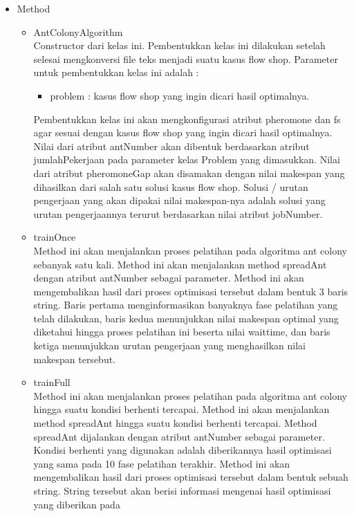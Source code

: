 \begin{itemize}
\begin{itemize}
\begin{itemize}
			\end{itemize}
			\item Method
			\begin{itemize}
				\item AntColonyAlgorithm \\
				Constructor dari kelas ini. Pembentukkan kelas ini dilakukan setelah selesai mengkonversi 
				file teks menjadi suatu kasus flow shop. Parameter untuk pembentukkan
				kelas ini adalah :
				\begin{itemize}
					\item problem : kasus flow shop yang ingin dicari hasil optimalnya.
				\end{itemize}
				Pembentukkan kelas ini akan mengkonfigurasi atribut pheromone dan fs agar sesuai
				dengan kasus flow shop yang ingin dicari hasil optimalnya. Nilai dari atribut
				antNumber akan dibentuk berdasarkan atribut jumlahPekerjaan pada parameter
				kelas Problem yang dimasukkan. Nilai dari atribut pheromoneGap akan disamakan
				dengan nilai makespan yang dihasilkan dari salah satu solusi kasus flow shop.
				Solusi / urutan pengerjaan yang akan dipakai nilai makespan-nya adalah solusi yang
				urutan pengerjaannya terurut berdasarkan nilai atribut jobNumber.
				\item trainOnce \\
				Method ini akan menjalankan proses pelatihan pada algoritma ant colony sebanyak
				satu kali. Method ini akan menjalankan method spreadAnt dengan atribut antNumber
				sebagai parameter. Method ini akan mengembalikan hasil dari proses optimisasi
				tersebut dalam bentuk 3 baris string. Baris pertama menginformasikan banyaknya
				fase pelatihan yang telah dilakukan, baris kedua menunjukkan nilai makespan
				optimal yang diketahui hingga proses pelatihan ini beserta nilai waittime, dan baris 
				ketiga menunjukkan urutan pengerjaan yang menghasilkan nilai makespan tersebut.
				\item trainFull \\
				Method ini akan menjalankan proses pelatihan pada algoritma ant colony hingga
				suatu kondisi berhenti tercapai. Method ini akan menjalankan method spreadAnt
				hingga suatu kondisi berhenti tercapai. Method spreadAnt dijalankan dengan atribut
				antNumber sebagai parameter. Kondisi berhenti yang digunakan adalah diberikannya
				hasil optimisasi yang sama pada 10 fase pelatihan terakhir. Method ini akan
				mengembalikan hasil dari proses optimisasi tersebut dalam bentuk sebuah string.
				String tersebut akan berisi informasi mengenai hasil optimisasi yang diberikan pada

\end{itemize}
\end{itemize}
\end{itemize}
